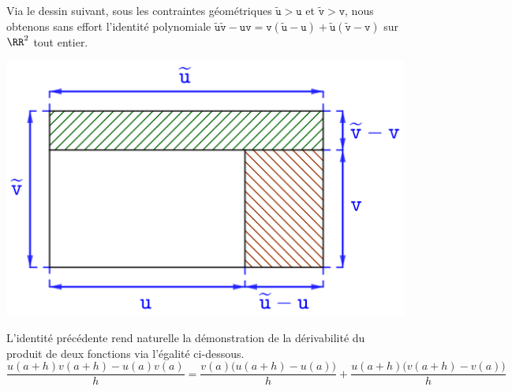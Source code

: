 \begin{example}
    Via le dessin suivant, sous les contraintes géométriques
    $\widetilde{\mathtt{u}} > \mathtt{u}$
    et
    $\widetilde{\mathtt{v}} > \mathtt{v}$,
    nous obtenons sans effort l'identité polynomiale
    $ \widetilde{\mathtt{u}} \widetilde{\mathtt{v}}
    - \mathtt{u} \mathtt{v}
    = \mathtt{v} ( \widetilde{\mathtt{u}} - \mathtt{u} )
    + \widetilde{\mathtt{u}} ( \widetilde{\mathtt{v}} - \mathtt{v} )$
    sur $\RR^2$ tout entier.

	\begin{center}
		\includegraphics[scale=.75]{proder.png}
	\end{center}
    
    L'identité précédente rend naturelle la démonstration de la dérivabilité du produit de deux fonctions via l'égalité ci-dessous.
    \[
          \frac{u(a+h) v(a+h) - u(a) v(a)}{h}
        = \frac{v(a) \big( u(a+h) - u(a) \big)}{h} 
        + \frac{u(a+h) \big( v(a+h) - v(a) \big)}{h}
    \]
\end{example}
